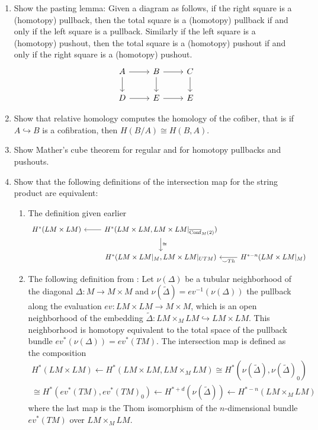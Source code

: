 \documentclass{scrartcl}
\theoremstyle{plain}
\theoremstyle{definition}
\newcommand{\cupp}{\mathbin{\smile}}
\newcommand{\iso}{\cong}
\newcommand{\from}{\leftarrow}
\newcommand{\injto}{\hookrightarrow}
\DeclareMathOperator{\cConf}{\overline{Conf}}
\begin{document}
\begin{enumerate}
\item Show the pasting lemma: Given a diagram as follows, if the right square is a (homotopy) pullback, then the total square is a (homotopy) pullback if and only if the left square is a pullback. Similarly if the left square is a (homotopy) pushout, then the total square is a (homotopy) pushout if and only if the right square is a (homotopy) pushout.
\begin{equation}
    \begin{tikzcd}
        A \dar\rar & B \dar\rar &\dar C \\
        D \rar & E \rar & E 
    \end{tikzcd}
\end{equation}

\item Show that relative homology computes the homology of the cofiber, that is if $A\injto B$ is a cofibration, then $H(B/A) \iso H(B, A)$.

\item Show Mather's cube theorem for regular and for homotopy pullbacks and pushouts. 

\item Show that the following definitions of the intersection map for the string product are equivalent:
\begin{enumerate}
    \item The definition given earlier
    \begin{equation}
        \begin{tikzcd}
            H^{*}(LM \times LM) & \lar H^*(LM\times LM, LM\times LM|_{\cConf_M(2)}) \dar["\iso"] & &\\
            & H^*(LM\times LM|_{M}, LM\times LM|_{UTM}) & \lar["\cupp Th"] H^{*-n}(LM\times LM|_M)
        \end{tikzcd}
    \end{equation}
    \item The following definition from \cite{cohen2002homotopy}: Let $\nu(\Delta)$ be a tubular neighborhood of the diagonal $\Delta\colon M \to M\times M$ and $\nu(\tilde\Delta) = ev^{-1}(\nu(\Delta))$ the pullback along the evaluation $ev\colon LM\times LM\to M\times M$, which is an open neighborhood of the embedding $\tilde\Delta\colon LM\times_M LM\injto LM\times LM$. This neighborhood is homotopy equivalent to the total space of the pullback bundle $ev^*(\nu(\Delta)) = ev^*(TM)$. The intersection map is defined as the composition
    \begin{align*}
        H^*(LM\times LM) \from H^*(LM\times LM, LM\times_M LM) \iso H^*(\nu(\tilde\Delta), \nu(\tilde\Delta)_0) \\ 
        \iso H^* (ev^*(TM), ev^*(TM)_0) \from H^{*+d}(\nu(\tilde\Delta)) \from H^{*-n}(LM\times_M LM)
    \end{align*}
    where the last map is the Thom isomorphism of the $n$-dimensional bundle $ev^*(TM)$ over $LM\times_M LM$.
\end{enumerate}


\end{enumerate}
\end{document}
